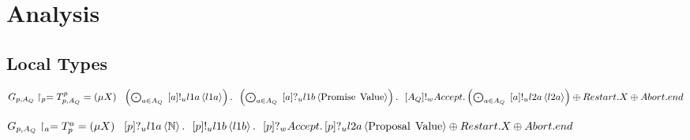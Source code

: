 \chapter{Analysis}

\section{Local Types}
$\GlobalTypeProjection{p} = \LocalTypeProposer = \Mu{X}\\
\Indent{1}\DotForall{a \in \AQ}{\SendUnreliableL{a}{\LOneA}{\mathbb{N}}} .\\
\Indent{1}\DotForall{a \in \AQ}{\ReceiveUnreliableL{a}{\LOneB}{\Promise{\Value}}} .\\
\Indent{1}\SendWeaklyL{\AQ}{\Accept . \DotForall{a \in \AQ}{\SendUnreliableL{a}{\LTwoA}{\Proposal{\Value}}} \oplus \Restart . X \oplus \Abort . end}$

$\GlobalTypeProjection{a} = \LocalTypeAcceptor = \Mu{X}\\
\Indent{1}\ReceiveUnreliableL{p}{\LOneA}{\mathbb{N}} .\\
\Indent{1}\SendUnreliableL{p}{\LOneB}{\Promise{\Value}} .\\
\Indent{1}\ReceiveWeaklyL{p}{\Accept . \ReceiveUnreliableL{p}{\LTwoA}{\Proposal{\Value}} \oplus \Restart . X \oplus \Abort . end}$
